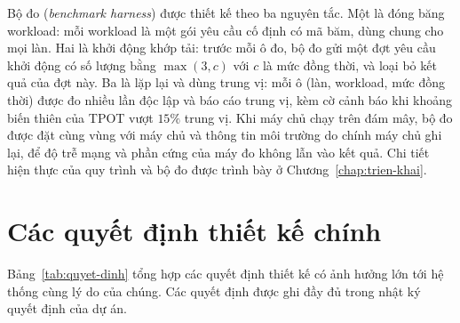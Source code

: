 Bộ đo (\textit{benchmark harness}) được thiết kế theo ba nguyên tắc. Một là đóng băng workload: mỗi workload là một gói yêu cầu cố định có mã băm, dùng chung cho mọi làn. Hai là khởi động khớp tải: trước mỗi ô đo, bộ đo gửi một đợt yêu cầu khởi động có số lượng bằng $\max(3, c)$ với $c$ là mức đồng thời, và loại bỏ kết quả của đợt này. Ba là lặp lại và dùng trung vị: mỗi ô (làn, workload, mức đồng thời) được đo nhiều lần độc lập và báo cáo trung vị, kèm cờ cảnh báo khi khoảng biến thiên của TPOT vượt $15\%$ trung vị. Khi máy chủ chạy trên đám mây, bộ đo được đặt cùng vùng với máy chủ và thông tin môi trường do chính máy chủ ghi lại, để độ trễ mạng và phần cứng của máy đo không lẫn vào kết quả. Chi tiết hiện thực của quy trình và bộ đo được trình bày ở Chương~\ref{chap:trien-khai}.

\section{Các quyết định thiết kế chính}
\label{sec:quyet-dinh}

Bảng~\ref{tab:quyet-dinh} tổng hợp các quyết định thiết kế có ảnh hưởng lớn tới hệ thống cùng lý do của chúng. Các quyết định được ghi đầy đủ trong nhật ký quyết định của dự án.

